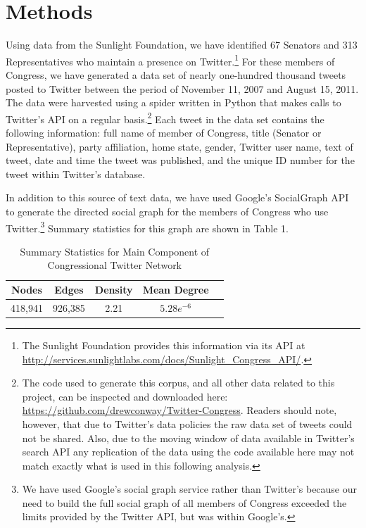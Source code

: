 \documentclass[10pt]{article}
\begin{document}
\section{Methods}
Using data from the Sunlight Foundation, we have identified 67 Senators and 313 Representatives who maintain a presence on Twitter.\footnote{The Sunlight Foundation provides this information via its API at \url{http://services.sunlightlabs.com/docs/Sunlight_Congress_API/}.} For these members of Congress, we have generated a data set of nearly one-hundred thousand tweets posted to Twitter between the period of November 11, 2007 and August 15, 2011.  The data were harvested using a spider written in Python that makes calls to Twitter's API on a regular basis.\footnote{The code used to generate this corpus, and all other data related to this project, can be inspected and downloaded here: \url{https://github.com/drewconway/Twitter-Congress}.  Readers should note, however, that due to Twitter's data policies the raw data set of tweets could not be shared.  Also, due to the moving window of data available in Twitter's search API any replication of the data using the code available here may not match exactly what is used in this following analysis.}  Each tweet in the data set contains the following information: full name of member of Congress, title (Senator or Representative), party affiliation, home state, gender, Twitter user name, text of tweet, date and time the tweet was published, and the unique ID number for the tweet within Twitter's database.

In addition to this source of text data, we have used Google's SocialGraph API to generate the directed social graph for the members of Congress who use Twitter.\footnote{We have used Google's social graph service rather than Twitter's because our need to build the full social graph of all members of Congress exceeded the limits provided by the Twitter API, but was within Google's.} Summary statistics for this graph are shown in Table 1. %

\begin{table}[htdp]
    \centering
    \caption{Summary Statistics for Main Component of Congressional Twitter Network}
    \begin{tabular}{|c|c|c|c|c|}
        \hline
        Nodes & Edges & Density & Mean Degree \\ \hline
        418,941 & 926,385 & 2.21 & $5.28e^{-6}$ \\ \hline
    \end{tabular}
\end{table}
\end{document}
